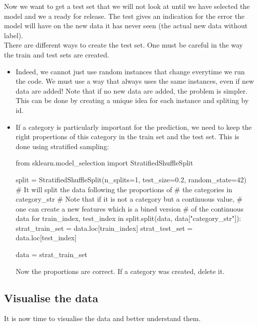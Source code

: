 \documentclass{article}
\begin{document}
Now we want to get a test set that we will not look at until we have selected the model and we a ready for release. The test gives an indication for the error the model will have on the new data it has never seen (the actual new data without label).\\

There are different ways to create the test set.
One must be careful in the way the train and test sets are created.
\begin{itemize}
  \item Indeed, we cannot just use random instances that change everytime we run the code.
    We must use a way that always uses the same instances, even if new data are added!
    Note that if no new data are added, the problem is simpler.
    This can be done by creating a unique idea for each instance and spliting by id.
  \item If a category is particularly important for the prediction, we need to keep the right propertions of this category in the train set and the test set.
  This is done using stratified sampling:
  \begin{python}
    from sklearn.model_selection import StratifiedShuffleSplit

    split = StratifiedShuffleSplit(n_splits=1, test_size=0.2,
                                   random_state=42)
    # It will split the data following the proportions of
    # the categories in category_str
    # Note that if it is not a category but a continuous value,
    # one can create a new features which is a bined version
    # of the continuous data
    for train_index, test_index in split.split(data,
                                        data["category_str"]):
      strat_train_set = data.loc[train_index]
      strat_test_set = data.loc[test_index]

    data = strat_train_set
  \end{python}
  Now the proportions are correct.
  If a category was created, delete it.
\end{itemize}

\subsection{Visualise the data}
It is now time to visualise the data and better understand them.
\end{document}
